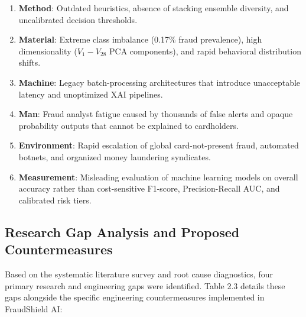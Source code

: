 \documentclass[12pt,a4paper,oneside]{report}
\begin{document}
\begin{enumerate}[leftmargin=0.35in]
\item \textbf{Method}: Outdated heuristics, absence of stacking ensemble diversity, and uncalibrated decision thresholds.
\item \textbf{Material}: Extreme class imbalance (0.17\% fraud prevalence), high dimensionality ($V_1-V_{28}$ PCA components), and rapid behavioral distribution shifts.
\item \textbf{Machine}: Legacy batch-processing architectures that introduce unacceptable latency and unoptimized XAI pipelines.
\item \textbf{Man}: Fraud analyst fatigue caused by thousands of false alerts and opaque probability outputs that cannot be explained to cardholders.
\item \textbf{Environment}: Rapid escalation of global card-not-present fraud, automated botnets, and organized money laundering syndicates.
\item \textbf{Measurement}: Misleading evaluation of machine learning models on overall accuracy rather than cost-sensitive F1-score, Precision-Recall AUC, and calibrated risk tiers.
\end{enumerate}


\subsection{Research Gap Analysis and Proposed Countermeasures}

Based on the systematic literature survey and root cause diagnostics, four primary research and engineering gaps were identified. Table 2.3 details these gaps alongside the specific engineering countermeasures implemented in FraudShield AI:
\end{document}
